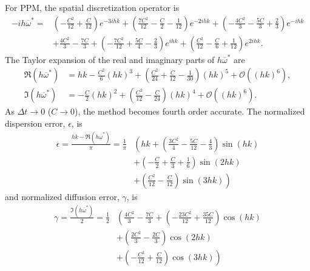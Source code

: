 \documentclass[review]{elsarticle}
\begin{document}
For PPM, the spatial discretization operator is
\begin{align*}
  -ih\overline{\omega}^* = & \left(- \frac{C^{2}}{12} + \frac{C}{12}\right) e^{- 3 i h k} + \left(\frac{7 C^{2}}{12} - \frac{C}{2}- \frac{1}{12}\right) e^{- 2 i h k} + \left(- \frac{4 C^{2}}{3} - \frac{5 C}{3} + \frac{2}{3}\right) e^{- i h k}\\
  & + \frac{4 C^{2}}{3} - \frac{7 C}{3} + \left(- \frac{7 C^{2}}{12} + \frac{5 C}{4} - \frac{2}{3}\right) e^{i h k} + \left(\frac{C^{2}}{12} - \frac{C}{6} + \frac{1}{12}\right) e^{2 i h k}.
\end{align*}
The Taylor expansion of the real and imaginary parts of $h\overline{\omega}^*$ are
\begin{align*}
  \Re (h\overline{\omega}^*) &= hk - \frac{C^2}{6} (hk)^3 + \left( \frac{C^2}{24} + \frac{C}{12} - \frac{1}{30} \right) (hk)^5 + \mathcal{O}\left((hk)^6\right),\\
  \Im (h\overline{\omega}^*) &= -\frac{C}{2} (hk)^2 + \left( \frac{C^2}{12} - \frac{C}{24} \right) (hk)^4 + \mathcal{O}\left((hk)^6\right).
\end{align*}
As $\Delta t \to 0$ ($C \to 0$), the method becomes fourth order
accurate. The normalized dispersion error, $\epsilon$, is
\begin{align*}
  \epsilon =\frac{hk - \Re (h\overline{\omega}^*)}{\pi} = \frac{1}{\pi} &\left( hk + \left( \frac{3C^2}{4} - \frac{5C}{12} - \frac{4}{3} \right) \sin(hk) \right.\\
                                                                        &\left. + \left( -\frac{C}{2} + \frac{C}{3} + \frac{1}{6} \right) \sin(2hk)\right.\\
                                                                        &\left. + \left( \frac{C^2}{12} - \frac{C}{12} \right) \sin(3hk)\right)
\end{align*}
and normalized diffusion error, $\gamma$, is
\begin{align*}
  \gamma = \frac{\Im (h\overline{\omega}^*)}{2} = \frac{1}{2}  &\left( \frac{4C^2}{3} - \frac{7C}{3} + \left( -\frac{23C^2}{12} + \frac{35C}{12} \right) \cos(hk) \right.\\
                                                               &\left. + \left( \frac{2C^2}{3} - \frac{2C}{3} \right) \cos(2hk)\right.\\
                                                                        &\left. + \left( -\frac{C^2}{12} + \frac{C}{12} \right) \cos(3hk)\right)
\end{align*}
\end{document}

